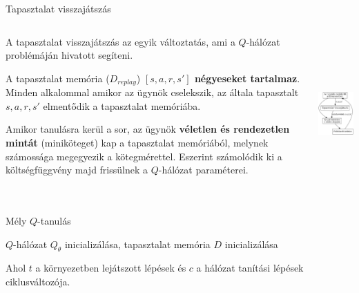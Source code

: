 \documentclass[english, aspectratio=169]{beamer}
\begin{document}
\begin{frame}{Tapasztalat visszajátszás}
\begin{columns}
\begin{column}{.65\textwidth}
A tapasztalat visszajátszás az egyik változtatás, ami a $Q$-hálózat problémáján hivatott segíteni.\par\smallskip
A tapasztalat memória ($D_{replay}$) \textbf{$[s,a,r,s']$ négyeseket tartalmaz}. Minden alkalommal amikor az ügynök cselekszik, az általa tapasztalt $s, a, r, s'$ elmentődik a tapasztalat memóriába.\par\smallskip
Amikor tanulásra kerül a sor, az ügynök \textbf{véletlen és rendezetlen mintát} (miniköteget) kap a tapasztalat memóriából, melynek számossága megegyezik a kötegmérettel. Eszerint számolódik ki a költségfüggvény majd frissülnek a $Q$-hálózat paraméterei.
\end{column}
\begin{column}{.35\textwidth}
\begin{center}
\includegraphics[height=6cm, keepaspectratio]{../../5_ql/doc/graphs/ql_4.png}
\end{center}
\end{column}
\end{columns}
\end{frame}

\begin{frame}{}
\begin{algorithm}[H]
\caption{Mély $Q$-tanulás}
\SetAlgoLined
$Q$-hálózat $Q_\theta$ inicializálása, tapasztalat memória $D$ inicializálása\;
\end{algorithm}
Ahol $t$ a környezetben lejátszott lépések és $c$ a hálózat tanítási lépések ciklusváltozója.
\end{frame}
\end{document}

